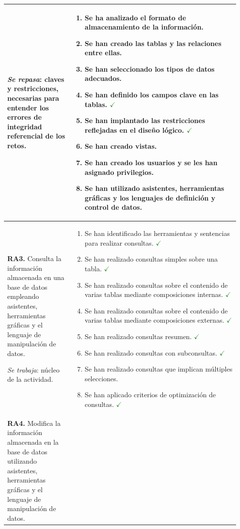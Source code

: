 \documentclass[11pt,a4paper]{article}
\newcommand{\trab}{\textcolor{ForestGreen}{\ensuremath{\checkmark}}}
\begin{document}
\begin{longtable}{@{}p{0.27\linewidth}p{0.68\linewidth}@{}}
\smallskip\emph{Se repasa}: claves y restricciones, necesarias para entender los errores de
integridad referencial de los retos.
&
\begin{enumerate}[label=\alph*), leftmargin=*, nosep]
  \item Se ha analizado el formato de almacenamiento de la información.
  \item Se han creado las tablas y las relaciones entre ellas.
  \item Se han seleccionado los tipos de datos adecuados.
  \item Se han definido los campos clave en las tablas. \trab
  \item Se han implantado las restricciones reflejadas en el diseño lógico. \trab
  \item Se han creado vistas.
  \item Se han creado los usuarios y se les han asignado privilegios.
  \item Se han utilizado asistentes, herramientas gráficas y los lenguajes de definición
        y control de datos.
\end{enumerate} \\
\midrule
\textbf{RA3.} Consulta la información almacenada en una base de datos empleando
asistentes, herramientas gráficas y el lenguaje de manipulación de datos.

\smallskip\emph{Se trabaja}: núcleo de la actividad.
&
\begin{enumerate}[label=\alph*), leftmargin=*, nosep]
  \item Se han identificado las herramientas y sentencias para realizar consultas. \trab
  \item Se han realizado consultas simples sobre una tabla. \trab
  \item Se han realizado consultas sobre el contenido de varias tablas mediante
        composiciones internas. \trab
  \item Se han realizado consultas sobre el contenido de varias tablas mediante
        composiciones externas. \trab
  \item Se han realizado consultas resumen. \trab
  \item Se han realizado consultas con subconsultas. \trab
  \item Se han realizado consultas que implican múltiples selecciones.
  \item Se han aplicado criterios de optimización de consultas. \trab
\end{enumerate} \\
\midrule
\textbf{RA4.} Modifica la información almacenada en la base de datos utilizando
asistentes, herramientas gráficas y el lenguaje de manipulación de datos.


\end{longtable}
\end{document}
